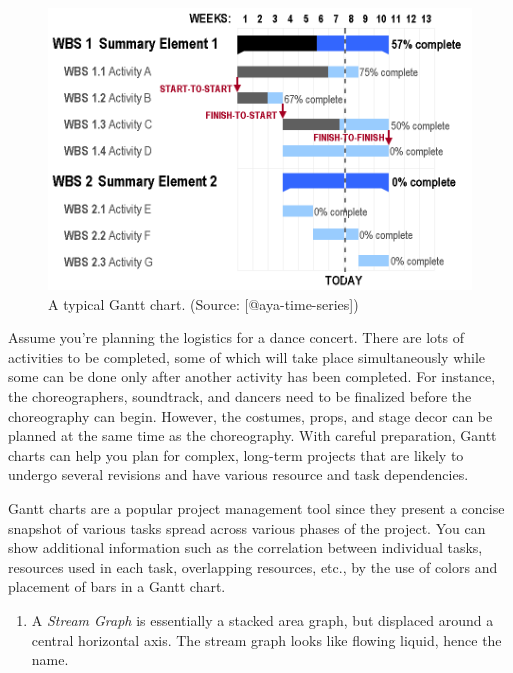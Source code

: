 \documentclass[]{book}
\providecommand{\tightlist}{%
  \setlength{\itemsep}{0pt}\setlength{\parskip}{0pt}}
\theoremstyle{definition}
\theoremstyle{definition}
\theoremstyle{definition}
\theoremstyle{remark}
\begin{document}
\begin{figure}

{\centering \includegraphics[width=0.5\linewidth]{images/aya-gantt} 

}

\caption{A typical Gantt chart. (Source: [@aya-time-series])}\label{fig:aya-gantt}
\end{figure}

Assume you're planning the logistics for a dance concert. There are lots
of activities to be completed, some of which will take place
simultaneously while some can be done only after another activity has
been completed. For instance, the choreographers, soundtrack, and
dancers need to be finalized before the choreography can begin. However,
the costumes, props, and stage decor can be planned at the same time as
the choreography. With careful preparation, Gantt charts can help you
plan for complex, long-term projects that are likely to undergo several
revisions and have various resource and task dependencies.

Gantt charts are a popular project management tool since they present a
concise snapshot of various tasks spread across various phases of the
project. You can show additional information such as the correlation
between individual tasks, resources used in each task, overlapping
resources, etc., by the use of colors and placement of bars in a Gantt
chart.

\begin{enumerate}
\def\labelenumi{\arabic{enumi}.}
\setcounter{enumi}{4}
\tightlist
\item
  A \emph{Stream Graph} is essentially a stacked area graph, but
  displaced around a central horizontal axis. The stream graph looks
  like flowing liquid, hence the name.
\end{enumerate}
\end{document}
